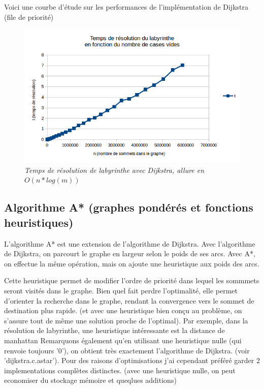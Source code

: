 \documentclass[10pt]{article}
\begin{document}
				Voici une courbe d'étude sur les performances de l'implémentation de Dijkstra (file de priorité)
				\begin{figure}[H]
					\begin{center}
						\includegraphics[width=12cm,height=\textheight,keepaspectratio]{./images/courbe_temps.png}
					\end{center}
					\caption{\textit{Temps de résolution de labyrinthe avec Dijkstra, allure en \(O(n * log(m))\)}}
					\label{courbe_temps}
				\end{figure}

		\subsection{Algorithme A* (graphes pondérés et fonctions heuristiques)}
			L'algorithme A* est une extension de l'algorithme de Dijkstra. Avec l'algorithme de Dijkstra, on parcourt
			le graphe en largeur selon le poids de ses arcs. Avec A*, on effectue la même opération,
			mais on ajoute une heuristique \cite{heuristique} aux poids des arcs.\newline
			
			Cette heuristique permet de modifier l'ordre de priorité dans lequel les sommmets seront visités dans le graphe.
			Bien quel fait perdre l'optimalité, elle permet d'orienter la recherche dans le graphe, rendant la convergence vers
			le sommet de destination plus rapide.
			(et avec une heuristique bien conçu au problème, on s'assure tout de même une solution proche de l'optimal).
			Par exemple, dans la résolution de labyrinthe, une heuristique intéressante est la distance de manhattan \cite{manhattan}			
			Remarquons également qu'en utilisant une heuristique nulle (qui renvoie toujours '0'),
			on obtient très exactement l'algorithme de Dijkstra. (voir 'dijkstra.c.astar').
			Pour des raisons d'optimisations j'ai cependant préféré garder 2 implementations complètes distinctes.
			(avec une heuristique nulle, on peut economiser du stockage mémoire et queqlues additions)
\end{document}
